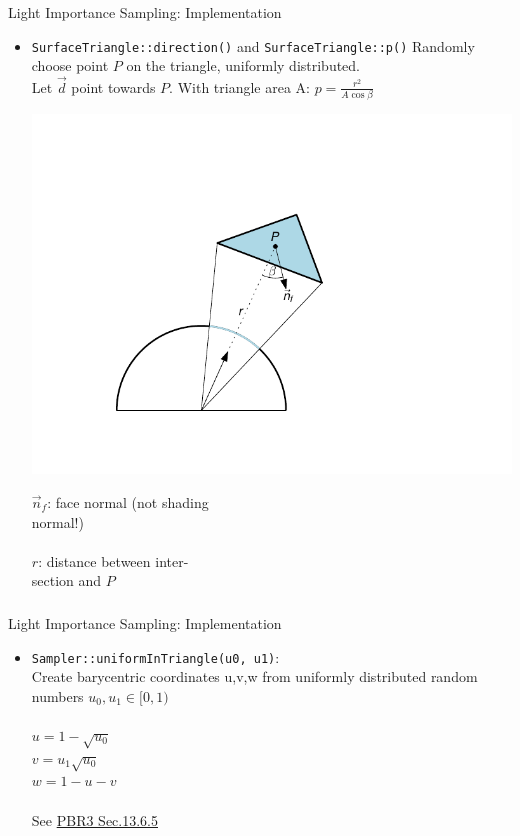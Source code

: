 \documentclass[utf8,stillsansserifmath,fleqn,t]{beamer}
\newcommand{\code}[1]{\texttt{#1}}
\begin{document}
\begin{frame}
\frametitle{\insertsection}
Light Importance Sampling: Implementation
\begin{itemize}
\item \code{SurfaceTriangle::direction()} and \code{SurfaceTriangle::p()}
    Randomly choose point $P$ on the triangle, uniformly distributed.\\
    Let $\vec{d}$ point towards $P$. With triangle area A:
    $p = \frac{r^2}{A\cos\beta}$\\
    \begin{minipage}{.42\textwidth}
    \includegraphics[width=\textwidth]{./fig/direction-to-triangle.pdf}
    \end{minipage}\hfill
    \begin{minipage}{.43\textwidth}
    $\vec{n}_f$: face normal (not shading\\ normal!)\\~\\
    $r$: distance between inter-\\section and $P$\\
    \end{minipage}
\end{itemize}
\end{frame}

\begin{frame}
\frametitle{\insertsection}
Light Importance Sampling: Implementation
\begin{itemize}
\item \code{Sampler::uniformInTriangle(u0, u1)}:\\
Create barycentric coordinates u,v,w
from uniformly distributed random numbers $u_0, u_1 \in [0,1)$\\~\\
$u = 1-\sqrt{u_0}$\\
$v = u_1 \sqrt{u_0}$\\
$w = 1 - u - v$\\~\\
See \href{https://www.pbr-book.org/3ed-2018/Monte_Carlo_Integration/2D_Sampling_with_Multidimensional_Transformations}{PBR3
Sec.13.6.5}
\end{itemize}
\end{frame}
\end{document}
